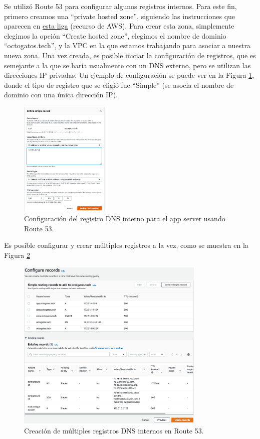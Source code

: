 \documentclass{article}
\begin{document}
Se utiliz\'o Route 53 para configurar algunos registros
internos.   Para este fin, primero creamos una
``private hosted zone'', siguiendo las instrucciones
que aparecen en
\href{https://docs.aws.amazon.com/Route53/latest/DeveloperGuide/hosted-zone-private-creating.html}{esta liga} (recurso
de AWS).   Para crear esta zona, simplemente elegimos
la opci\'on ``Create hosted zone'', elegimos el
nombre de dominio ``octogatos.tech'', y la VPC en la
que estamos trabajando para asociar a nuestra nueva
zona. Una vez creada, es posible iniciar la configuraci\'on
de registros, que es semejante a la que se har\'ia
usualmente con un DNS externo, pero se utilizan las
direcciones IP privadas.   Un ejemplo de configuraci\'on
se puede ver en la Figura \ref{fig:defineRecord}, donde
el tipo de registro que se eligi\'o fue ``Simple'' (se
asocia el nombre de dominio con una \'unica direcci\'on
IP).

\begin{figure}[H]
  \centering
  \includegraphics[width=0.38\textwidth]{DNS/defineRecord}
  \caption{Configuraci\'on del registro DNS interno para el
           app server usando Route 53.}
  \label{fig:defineRecord}
\end{figure}

Es posible configurar y crear m\'ultiples registros
a la vez, como se muestra en la Figura
\ref{fig:createRecord}

\begin{figure}[H]
  \centering
  \includegraphics[width=0.8\textwidth]{DNS/createRecord}
  \caption{Creaci\'on de m\'ultiples registros DNS internos
           en Route 53.}
  \label{fig:createRecord}
\end{figure}
\end{document}
